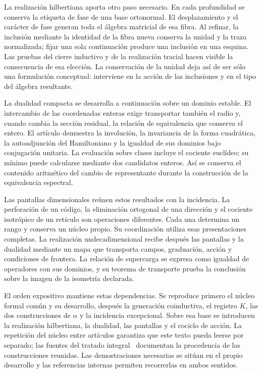 La realización hilbertiana aporta otro paso necesario. En cada
profundidad se conserva la etiqueta de fase de una base ortonormal.
El desplazamiento y el carácter de fase generan toda el álgebra
matricial de esa fibra. Al refinar, la inclusión mediante la identidad
de la fibra nueva conserva la unidad y la traza normalizada; fijar una
sola continuación produce una inclusión en una esquina. Las pruebas
del cierre inductivo y de la realización tracial hacen visible la
consecuencia de esa elección. La conservación de la unidad deja así
de ser sólo una formulación conceptual: interviene en la acción de
las inclusiones y en el tipo del álgebra resultante.

La dualidad compacta se desarrolla a continuación sobre un dominio
estable. El intercambio de las coordenadas enteras exige transportar
también el radio y, cuando cambia la sección residual, la relación de
equivalencia que conserva el entero. El artículo demuestra la
involución, la invariancia de la forma cuadrática, la autoadjunción
del Hamiltoniano y la igualdad de sus dominios bajo conjugación
unitaria. La evaluación sobre clases incluye el cociente euclídeo;
su mínimo puede calcularse mediante dos candidatos enteros. Así se
conserva el contenido aritmético del cambio de representante durante
la construcción de la equivalencia espectral.

Las pantallas dimensionales reúnen estos resultados con la incidencia.
La perforación de un código, la eliminación ortogonal de una dirección
y el cociente isotrópico de un retículo son operaciones diferentes.
Cada una determina un rango y conserva un núcleo propio. Su
coordinación utiliza esas presentaciones completas. La realización
undecadimensional recibe después las pantallas y la dualidad mediante
un mapa que transporta campos, graduación, acción y condiciones de
frontera. La relación de supercarga se expresa como igualdad de
operadores con sus dominios, y su teorema de transporte prueba la
conclusión sobre la imagen de la isometría declarada.

El orden expositivo mantiene estas dependencias. Se reproduce primero
el núcleo formal común y su desarrollo, después la generación
coinductiva, el registro \(K\), las dos construcciones de \(\alpha\)
y la incidencia excepcional. Sobre esa base se introducen la
realización hilbertiana, la dualidad, las pantallas y el cociclo de
acción. La repetición del núcleo entre artículos garantiza que este
texto pueda leerse por separado; las fuentes del tratado
integral~\cite{hmtedicionintegral} documentan la procedencia de las
construcciones reunidas. Las demostraciones necesarias se sitúan en
el propio desarrollo y las referencias internas permiten recorrerlas
en ambos sentidos.
